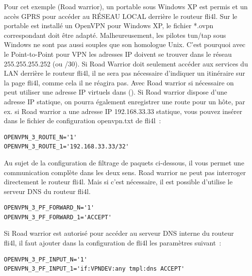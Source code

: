  Pour cet exemple (Road warrior), un portable sous Windows
XP est permis et un accès GPRS pour accéder au RÉSEAU LOCAL derrière le routeur fli4l.
Sur le portable est installé un OpenVPN pour Windows XP, le fichier *.ovpn
correspondant doit être adapté. Malheureusement, les pilotes tun/tap sous Windows
ne sont pas aussi souples que son homologue Unix. C'est pourquoi avec le Point-to-Point
pour VPN les adresses IP doivent se trouver dans le réseau 255.255.255.252 (ou /30).
Si Road Warrior doit seulement accéder aux services du LAN derrière le
routeur fli4l, il ne sera pas nécessaire d'indiquer un itinéraire sur la page fli4l,
comme cela il ne réagira pas. Avec Road warrior si nécessaire on peut utiliser une
adresse IP virtuels dans (). Si Road warrior
dispose d'une adresse IP statique, on pourra également enregistrer une route pour un hôte,
par ex. si Road warrior a une adresse IP 192.168.33.33 statique, vous pouvez insérer
dans le fichier de configuration openvpn.txt de fli4l~:

\begin{example}
\begin{verbatim}
OPENVPN_3_ROUTE_N='1'
OPENVPN_3_ROUTE_1='192.168.33.33/32'
\end{verbatim}
\end{example}

Au sujet de la configuration de filtrage de paquets ci-dessous, il vous permet
une communication complète dans les deux sens. Road warrior ne peut pas interroger
directement le routeur fli4l. Mais si c'est nécessaire, il est possible d'utilise
le serveur DNS du routeur fli4l.

\begin{example}
\begin{verbatim}
OPENVPN_3_PF_FORWARD_N='1'
OPENVPN_3_PF_FORWARD_1='ACCEPT'
\end{verbatim}
\end{example}

Si Road warrior est autorisé pour accéder au serveur DNS interne du routeur fli4l,
il faut ajouter dans la configuration de fli4l les paramètres suivant~:

\begin{example}
\begin{verbatim}
OPENVPN_3_PF_INPUT_N='1'
OPENVPN_3_PF_INPUT_1='if:VPNDEV:any tmpl:dns ACCEPT'
\end{verbatim}
\end{example}

